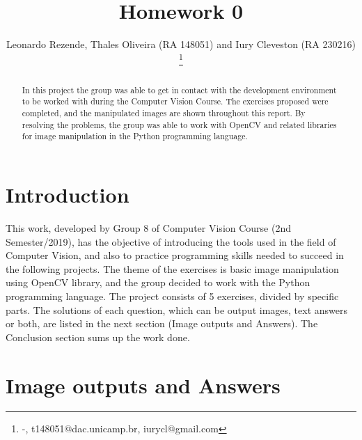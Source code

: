 \documentclass[]{IEEEtran}
\begin{document}
  \title{Homework 0}
  \author{Leonardo Rezende, Thales Oliveira (RA 148051) and Iury Cleveston (RA 230216)
    \thanks{-, t148051@dac.unicamp.br, iurycl@gmail.com}
  }
  \maketitle
  
  \begin{abstract}
    In this project the group was able to get in contact with the development environment to be worked with during the Computer Vision Course. The exercises proposed were completed, and the manipulated images are shown throughout this report. By resolving the problems, the group was able to work with OpenCV and related libraries for image manipulation in the Python programming language.
  \end{abstract}
  
  \section{Introduction}
  
  This work, developed by Group 8 of Computer Vision Course (2nd Semester/2019), has the objective of introducing the tools used in the field of Computer Vision, and also to practice programming skills needed to succeed in the following projects. The theme of the exercises is basic image manipulation using OpenCV library, and the group decided to work with the Python programming language. The project consists of 5 exercises, divided by specific parts. The solutions of each question, which can be output images, text answers or both, are listed in the next section (Image outputs and Answers). The Conclusion section sums up the work done. 


  \section{Image outputs and Answers}
\end{document}
